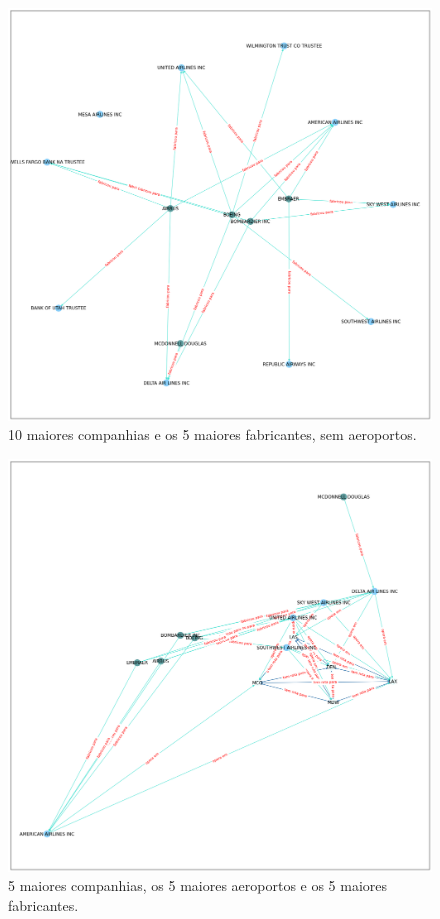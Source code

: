 \documentclass{article}
\begin{document}
\begin{figure}[H]
    \centering
    \includegraphics[width = \textwidth]{Imagens/10-0-5.png}
    \caption{10 maiores companhias e os 5 maiores fabricantes, sem aeroportos.}
    \label{view3}
\end{figure}

\begin{figure}[H]
    \centering
    \includegraphics[width = \textwidth]{Imagens/5-5-5.png}
    \caption{5 maiores companhias, os 5 maiores aeroportos e os 5 maiores fabricantes.}
    \label{view4}
\end{figure}
\end{document}
